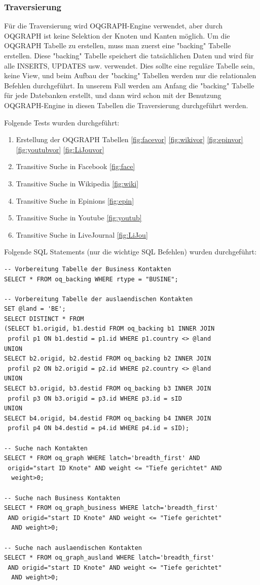 \phantom{Platzhalter wegen verwirrender Figure-Platzierung}

\subsubsection{Traversierung}
Für die Traversierung wird OQGRAPH-Engine verwendet, aber durch OQGRAPH ist keine Selektion der Knoten und Kanten möglich. Um die OQGRAPH Tabelle zu erstellen, muss man zuerst eine "backing" Tabelle erstellen. Diese "backing" Tabelle speichert die tatsächlichen Daten und wird für alle INSERTS, UPDATES usw. verwendet. Dies sollte eine reguläre Tabelle sein, keine View, und beim Aufbau der "backing" Tabellen werden nur die relationalen Befehlen durchgeführt. 
In unserem Fall werden am Anfang die "backing" Tabelle für jede Datebanken erstellt, und dann wird schon mit der Benutzung OQGRAPH-Engine in diesen Tabellen die Traversierung durchgeführt werden.

Folgende Tests wurden durchgeführt:
\begin{enumerate}
	\item Erstellung der OQGRAPH Tabellen \ref{fig:facevor}
	\ref{fig:wikivor}
	\ref{fig:epinvor}
	\ref{fig:youtubvor}
	\ref{fig:LiJouvor}
	\item Transitive Suche in Facebook
	\ref{fig:face}
	\item Transitive Suche in Wikipedia
	\ref{fig:wiki}
	\item Transitive Suche in Epinions 
	\ref{fig:epin}
	\item Transitive Suche in Youtube 
	\ref{fig:youtub}
	\item Transitive Suche in LiveJournal 
	\ref{fig:LiJou}
\end{enumerate}


Folgende SQL Statements (nur die wichtige SQL Befehlen) wurden durchgeführt:
\begin{lstlisting}
-- Vorbereitung Tabelle der Business Kontakten
SELECT * FROM oq_backing WHERE rtype = "BUSINE";

-- Vorbereitung Tabelle der auslaendischen Kontakten
SET @land = 'BE';
SELECT DISTINCT * FROM 
(SELECT b1.origid, b1.destid FROM oq_backing b1 INNER JOIN
 profil p1 ON b1.destid = p1.id WHERE p1.country <> @land
UNION
SELECT b2.origid, b2.destid FROM oq_backing b2 INNER JOIN
 profil p2 ON b2.origid = p2.id WHERE p2.country <> @land
UNION
SELECT b3.origid, b3.destid FROM oq_backing b3 INNER JOIN
 profil p3 ON b3.origid = p3.id WHERE p3.id = sID
UNION
SELECT b4.origid, b4.destid FROM oq_backing b4 INNER JOIN
 profil p4 ON b4.destid = p4.id WHERE p4.id = sID);
 
-- Suche nach Kontakten
SELECT * FROM oq_graph WHERE latch='breadth_first' AND
 origid="start ID Knote" AND weight <= "Tiefe gerichtet" AND
  weight>0;
  
-- Suche nach Business Kontakten
SELECT * FROM oq_graph_business WHERE latch='breadth_first'
 AND origid="start ID Knote" AND weight <= "Tiefe gerichtet"
  AND weight>0;
  
-- Suche nach auslaendischen Kontakten
SELECT * FROM oq_graph_ausland WHERE latch='breadth_first'
 AND origid="start ID Knote" AND weight <= "Tiefe gerichtet"
  AND weight>0;
\end{lstlisting}


